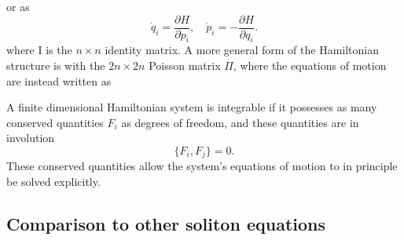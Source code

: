 \documentclass[english,master]{liumaiex}
\theoremstyle{plain}
\theoremstyle{definition}
\begin{document}
%
or as
%
\begin{equation}
	\dot{q}_i = \frac{\partial H}{\partial p_i}, \quad
	\dot{p}_i = -\frac{\partial H}{\partial q_i}.
\end{equation}
%
where I is the $n \times n$ identity matrix. A more general form of the Hamiltonian structure is with the $2n \times 2n$ Poisson matrix $\Pi$, where the equations of motion are instead written as

A finite dimensional Hamiltonian system is integrable if it possesses as many conserved quantities $F_i$ as degrees of freedom, and these quantities are in involution
%
\begin{equation}
	\{F_i, F_j\} = 0.
\end{equation}
%
These conserved quantities allow the system's equations of motion to in principle be solved explicitly. 

\subsection{Comparison to other soliton equations}
\end{document}
